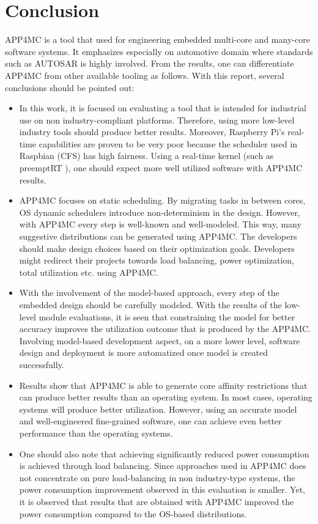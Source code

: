 \chapter{Conclusion} \label{conclusionchapter}
APP4MC is a tool that used for engineering embedded multi-core and many-core software systems. It emphasizes especially on automotive domain where standards such as AUTOSAR is highly involved. From the results, one can differentiate APP4MC from other available tooling as follows. With this report, several conclusions should be pointed out:
\begin{itemize}
	\item In this work, it is focused on evaluating a tool that is intended for industrial use on non industry-compliant platforms. Therefore, using more low-level industry tools should produce better results. Moreover, Raspberry Pi's real-time capabilities are proven to be very poor because the scheduler used in Raspbian (CFS) has high fairness. Using a real-time kernel (such as preemptRT \cite{preemptRT}), one should expect more well utilized software with APP4MC results.
	\item APP4MC focuses on static scheduling. By migrating tasks in between cores, OS dynamic schedulers introduce non-determinism in the design. However, with APP4MC every step is well-known and well-modeled. This way, many suggestive distributions can be generated using APP4MC. The developers should make design choices based on their optimization goals. Developers might redirect their projects towards load balancing, power optimization, total utilization etc. using APP4MC.
	\item With the involvement of the model-based approach, every step of the embedded design should be carefully modeled. With the results of the low-level module evaluations, it is seen that constraining the model for better accuracy improves the utilization outcome that is produced by the APP4MC. Involving model-based development aspect, on a more lower level, software design and deployment is more automatized once model is created successfully.
	\item Results show that APP4MC is able to generate core affinity restrictions that can produce better results than an operating system. In most cases, operating systems will produce better utilization. However, using an accurate model and well-engineered fine-grained software, one can achieve even better performance than the operating systems.
	\item One should also note that achieving significantly reduced power consumption is achieved through load balancing. Since approaches used in APP4MC does not concentrate on pure load-balancing in non industry-type systems, the power consumption improvement observed in this evaluation is smaller. Yet, it is observed that results that are obtained with APP4MC improved the power consumption compared to the OS-based distributions. 

\end{itemize}
